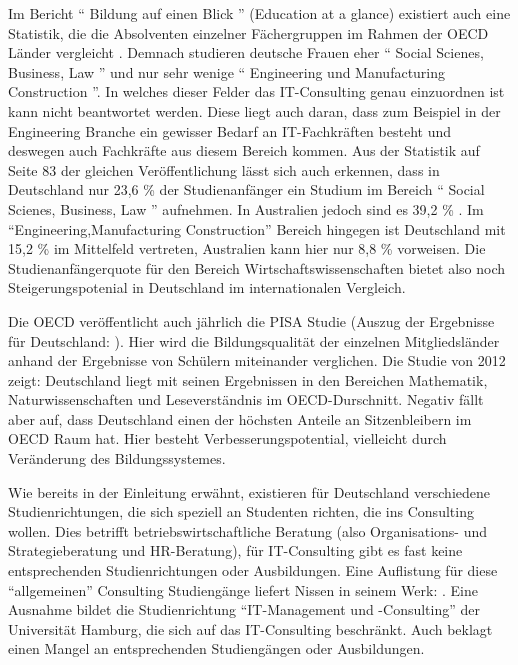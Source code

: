 Im Bericht `` Bildung auf einen Blick '' (Education at a glance) existiert auch eine Statistik, die die Absolventen einzelner Fächergruppen im Rahmen der OECD Länder vergleicht \cite{oecd3}. Demnach studieren deutsche Frauen eher `` Social Scienes, Business, Law '' und nur sehr wenige `` Engineering und Manufacturing Construction ''. In welches dieser Felder das IT-Consulting genau einzuordnen ist kann nicht beantwortet werden. Diese liegt auch daran, dass zum Beispiel in der Engineering Branche ein gewisser Bedarf an IT-Fachkräften besteht und deswegen auch Fachkräfte aus diesem Bereich kommen. Aus der Statistik auf Seite 83 der gleichen Veröffentlichung lässt sich auch erkennen, dass in Deutschland nur 23,6 \% der Studienanfänger ein Studium im Bereich `` Social Scienes, Business, Law '' aufnehmen. In Australien jedoch sind es 39,2 \% . Im ``Engineering,Manufacturing Construction'' Bereich hingegen ist Deutschland mit 15,2 \% im Mittelfeld vertreten, Australien kann hier nur  8,8 \% vorweisen. Die Studienanfängerquote für den Bereich Wirtschaftswissenschaften bietet also noch Steigerungspotenial in Deutschland im internationalen Vergleich.

Die OECD veröffentlicht auch jährlich die PISA Studie (Auszug der Ergebnisse für Deutschland: \cite{pisa} ). Hier wird die Bildungsqualität der einzelnen Mitgliedsländer anhand der Ergebnisse von Schülern miteinander verglichen. Die Studie von 2012 zeigt: Deutschland liegt mit seinen Ergebnissen in den Bereichen Mathematik, Naturwissenschaften und Leseverständnis im OECD-Durschnitt. Negativ fällt aber auf, dass Deutschland einen der höchsten Anteile an Sitzenbleibern im OECD Raum hat. Hier besteht Verbesserungspotential, vielleicht durch Veränderung des Bildungssystemes.

Wie bereits in der Einleitung erwähnt, existieren für Deutschland verschiedene Studienrichtungen, die sich speziell an Studenten richten, die ins Consulting wollen. Dies betrifft betriebswirtschaftliche Beratung (also Organisations- und Strategieberatung und HR-Beratung), für IT-Consulting gibt es fast keine entsprechenden Studienrichtungen oder Ausbildungen.
Eine Auflistung für diese ``allgemeinen'' Consulting Studiengänge liefert Nissen in seinem Werk: \cite{NissenKlaukDeelmannMohe201209}. 
Eine Ausnahme bildet die Studienrichtung ``IT-Management und -Consulting'' der Universität Hamburg, die sich auf das IT-Consulting beschränkt. Auch \cite{IDSScheer} beklagt einen Mangel an entsprechenden Studiengängen oder Ausbildungen.

